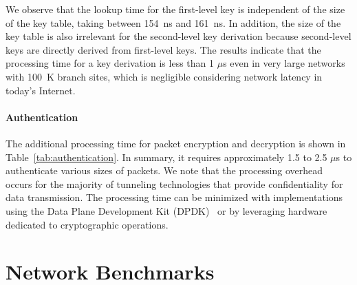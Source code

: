We observe that the lookup time for the first-level key is independent of the size of the key 
table, taking between \SI{154}{ns} and \SI{161}{ns}. In addition, the size of the key table is 
also irrelevant for the second-level key derivation 
because second-level keys are directly derived from first-level keys.
The results indicate that the processing time for a key derivation is less than 1 $\mu$s 
even in very large networks with \SI{100}{K} branch sites, which is negligible considering
network latency in today's Internet.


\paragraph{Authentication}
The additional processing time for packet encryption and decryption is shown in 
Table~\ref{tab:authentication}. In summary, it requires approximately 1.5 to 2.5 $\mu$s to
authenticate various sizes of packets. We note that the processing overhead occurs for the majority
of tunneling technologies that provide confidentiality for data transmission. The processing 
time can be minimized with implementations using the Data Plane Development Kit (DPDK)~\cite{dpdk} or by leveraging hardware dedicated to cryptographic operations.



\section{Network Benchmarks}
\label{sec:networkbenchmark}

